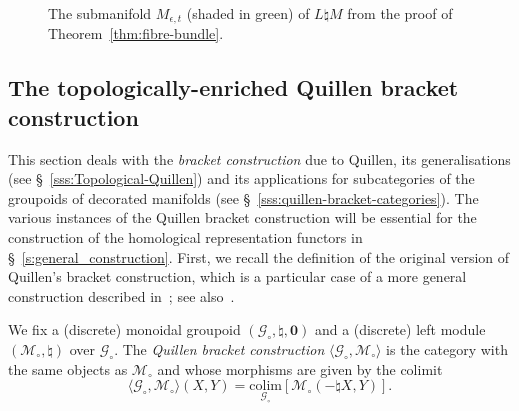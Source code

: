 \documentclass[AHL,Unicode,published]{cedram}
\newcommand{\colim}{\mathrm{colim}}
\newcommand{\zero}{\mathbf{0}}
\newcommand{\cG}{\mathcal{G}}
\newcommand{\cM}{\mathcal{M}}
\begin{document}
\begin{figure}[!htbp]
\caption{The submanifold $M_{\epsilon,t}$ (shaded in green) of $L \natural M$ from the proof of Theorem~\ref{thm:fibre-bundle}.}\label{fig:decorated-manifolds-Mepsilont}
\end{figure}


\subsection{The topologically-enriched Quillen bracket construction}\label{ss:Quillen_bracket_construction}

This section deals with the \emph{bracket construction} due to Quillen, its generalisations (see \S~\ref{sss:Topological-Quillen}) and its applications for subcategories of the groupoids of decorated manifolds (see \S~\ref{sss:quillen-bracket-categories}). The various instances of the Quillen bracket construction will be essential for the construction of the homological representation functors in \S~\ref{s:general_construction}. First, we recall the definition of the original version of Quillen's bracket construction, which is a particular case of a more general construction described in~\cite[p.~219]{graysonQuillen}; see also~\cite[\S~1.1]{RWW}.

\begin{defi}\label{def:non-enriched-Quillen}
We fix a (discrete) monoidal groupoid $(\cG_{\circ},\natural,\zero)$ and a (discrete) left module $(\cM_{\circ},\natural)$ over $\cG_{\circ}$. The \emph{Quillen bracket construction} $\langle \cG_{\circ},\cM_{\circ}\rangle $ is the category with the same objects as $\cM_{\circ}$ and whose morphisms are given by the colimit
\begin{equation}\label{eq:Quillen-bracket-colimit}
\langle \cG_{\circ},\cM_{\circ}\rangle(X,Y)=\underset{\cG_{\circ}}{\colim}[\cM_{\circ}(-\natural X,Y)].
\end{equation}
\end{defi}
\end{document}
